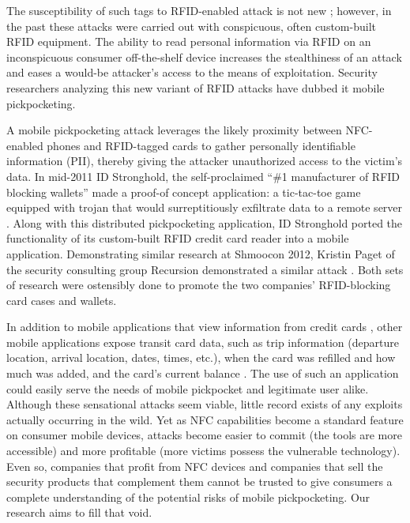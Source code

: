 \documentclass{sig-alternate}
\begin{document}
The susceptibility of such tags to RFID-enabled attack is not new \cite{picking-virtual-pockets} \cite{eavesdropping-attacks-hfrfid-tokens}; however, in the past these attacks were carried out with conspicuous, often custom-built RFID equipment.  The ability to read personal information via RFID on an inconspicuous consumer off-the-shelf device increases the stealthiness of an attack and eases a would-be attacker's access to the means of exploitation.  Security researchers analyzing this new variant of RFID attacks have dubbed it mobile pickpocketing.  

A mobile pickpocketing attack leverages the likely proximity between NFC-enabled phones and RFID-tagged cards to gather personally identifiable information (PII), thereby giving the attacker unauthorized access to the victim's data.  In mid-2011 ID Stronghold, the self-proclaimed ``\#1 manufacturer of RFID blocking wallets'' \cite{idstronghold-1} made a proof-of concept application:  a tic-tac-toe game equipped with trojan that would surreptitiously exfiltrate data to a remote server \cite{11alive-electronic-pickpocket-apps}.  Along with this distributed pickpocketing application, ID Stronghold ported the functionality of its custom-built RFID credit card reader into a mobile application.  Demonstrating similar research at Shmoocon 2012, Kristin Paget of the security consulting group Recursion demonstrated a similar attack \cite{forbes-1}.  Both sets of research were ostensibly done to promote the two companies' RFID-blocking card cases and wallets.  

In addition to mobile applications that view information from credit cards \cite{idstronghold-1}, other mobile applications expose transit card data, such as trip information (departure location, arrival location, dates, times, etc.), when the card was refilled and how much was added, and the card's current balance \cite{farebot-1}.  The use of such an application could easily serve the needs of mobile pickpocket and legitimate user alike.  Although these sensational attacks seem viable, little record exists of any exploits actually occurring in the wild.  Yet as NFC capabilities become a standard feature on consumer mobile devices, attacks become easier to commit (the tools are more accessible) and more profitable (more victims possess the vulnerable technology).  Even so, companies that profit from NFC devices and companies that sell the security products that complement them cannot be trusted to give consumers a complete understanding of the potential risks of mobile pickpocketing.  Our research aims to fill that void.
\end{document}
